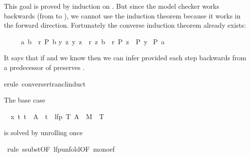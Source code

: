 \begin{isabellebody}
\begin{isamarkuptxt}
\begin{isabelle}
\end{isabelle}
This goal is proved by induction on . But since the model
checker works backwards (from  to ), we cannot use the
induction theorem  because it works in the
forward direction. Fortunately the converse induction theorem
 already exists:
\begin{isabelle}%
\ \ \ \ \ {\isasymlbrakk}{\isacharparenleft}a{\isacharcomma}\ b{\isacharparenright}\ {\isasymin}\ r\isactrlsup {\isacharasterisk}{\isacharsemicolon}\ P\ b{\isacharsemicolon}\isanewline
\isaindent{\ \ \ \ \ \ \ \ }{\isasymAnd}y\ z{\isachardot}\ {\isasymlbrakk}{\isacharparenleft}y{\isacharcomma}\ z{\isacharparenright}\ {\isasymin}\ r{\isacharsemicolon}\ {\isacharparenleft}z{\isacharcomma}\ b{\isacharparenright}\ {\isasymin}\ r\isactrlsup {\isacharasterisk}{\isacharsemicolon}\ P\ z{\isasymrbrakk}\ {\isasymLongrightarrow}\ P\ y{\isasymrbrakk}\isanewline
\isaindent{\ \ \ \ \ }{\isasymLongrightarrow}\ P\ a%
\end{isabelle}
It says that if  and we know  then we can infer
 provided each step backwards from a predecessor  of
 preserves .%
\end{isamarkuptxt}%
erule\ converse{\isacharunderscore}rtrancl{\isacharunderscore}induct{\isacharparenright}%
\begin{isamarkuptxt}%
\noindent
The base case
\begin{isabelle}%
\ {}{\isachardot}\ {\isasymAnd}x\ t{\isachardot}\ t\ {\isasymin}\ A\ {\isasymLongrightarrow}\ t\ {\isasymin}\ lfp\ {\isacharparenleft}{\isasymlambda}T{\isachardot}\ A\ {\isasymunion}\ M{\isasyminverse}\ {\isacharbackquote}{\isacharbackquote}\ T{\isacharparenright}%
\end{isabelle}
is solved by unrolling  once%
\end{isamarkuptxt}%
\ rule\ ssubst{\isacharbrackleft}OF\ lfp{\isacharunderscore}unfold{\isacharbrackleft}OF\ mono{\isacharunderscore}ef{\isacharbrackright}{\isacharbrackright}{\isacharparenright}%
\begin{isamarkuptxt}%
\begin{isabelle}%

\end{isabelle}
\end{isamarkuptxt}
\end{isabellebody}
